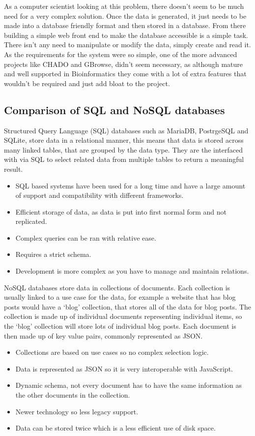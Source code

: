 As a computer scientist looking at this problem, there doesn't seem to be much need for a very complex solution. Once the data is generated, it just needs to be made into a database friendly format and then stored in a database. From there building a simple web front end to make the database accessible is a simple task. There isn't any need to manipulate or modify the data, simply create and read it. As the requirements for the system were so simple, one of the more advanced projects like CHADO and GBrowse, didn't seem necessary, as although mature and well supported in Bioinformatics they come with a lot of extra features that wouldn't be required and just add bloat to the project. 

  \subsection{Comparison of SQL and NoSQL databases}
  Structured Query Language (SQL) databases such as MariaDB, PostrgeSQL and SQLite, store data in a relational manner, this means that data is stored across many linked tables, that are grouped by the data type. They are the interfaced with via SQL to select related data from multiple tables to return a meaningful result. 
  
  \begin{itemize}
    \item SQL based systems have been used for a long time and have a large amount of support and compatibility with different frameworks. 
    \item Efficient storage of data, as data is put into first normal form and not replicated.
    \item Complex queries can be ran with relative ease.
    \item Requires a strict schema.
    \item Development is more complex as you have to manage and maintain relations.
  \end{itemize}

  NoSQL databases store data in collections of documents. Each collection is usually linked to a use case for the data, for example a website that has blog posts would have a `blog' collection, that stores all of the data for blog posts. The collection is made up of individual documents representing individual items, so the `blog' collection will store lots of individual blog posts. Each document is then made up of key value pairs, commonly represented as JSON.\@

  \begin{itemize}
    \item Collections are based on use cases so no complex selection logic.
    \item Data is represented as JSON so it is very interoperable with JavaScript.
    \item Dynamic schema, not every document has to have the same information as the other documents in the collection.
    \item Newer technology so less legacy support.
    \item Data can be stored twice which is a less efficient use of disk space.
  \end{itemize}

